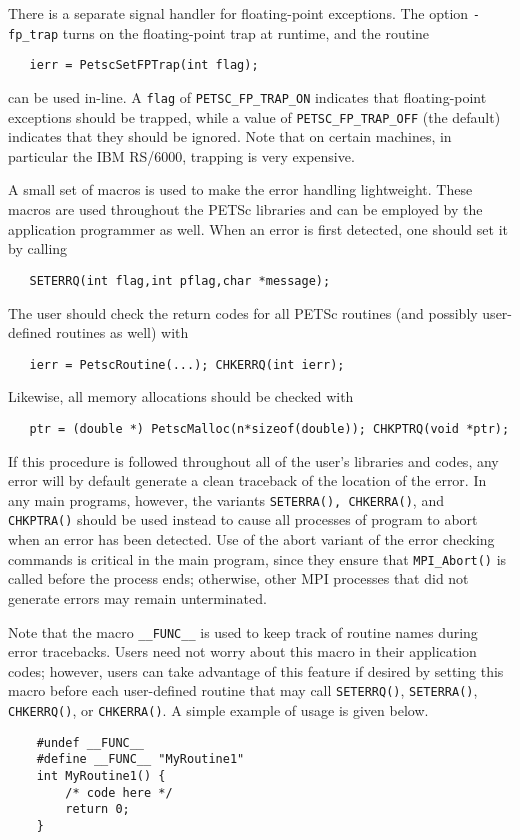 There is a separate signal handler for floating-point exceptions.
  
The option {\tt -fp\_trap} turns on the floating-point trap at runtime,
and the routine   
\begin{verbatim}
   ierr = PetscSetFPTrap(int flag);
\end{verbatim}
can be used in-line.
A {\tt flag} of {\tt PETSC\_FP\_TRAP\_ON} 
indicates that floating-point exceptions should be trapped,
while a value of {\tt PETSC\_FP\_TRAP\_OFF} (the default) indicates that they 
should be ignored.  Note that on certain machines, in particular 
the IBM RS/6000, trapping is very expensive.

A small set of macros is used to make the error handling lightweight.
These macros are used throughout the PETSc libraries and can be employed
by the application    
programmer as well.  When an error is first detected, 
one should set it by calling
\begin{verbatim}
   SETERRQ(int flag,int pflag,char *message);
\end{verbatim}
The user should check the return codes for all PETSc routines (and
possibly user-defined routines as well) with 
\begin{verbatim}
   ierr = PetscRoutine(...); CHKERRQ(int ierr);
\end{verbatim}
Likewise, all memory allocations should be checked with 
\begin{verbatim}
   ptr = (double *) PetscMalloc(n*sizeof(double)); CHKPTRQ(void *ptr);
\end{verbatim}
If this procedure is followed throughout all of the user's libraries 
and codes, any error will by default generate a clean traceback of 
the location   
of the error.  In any main programs, however, the variants
{\tt SETERRA(), CHKERRA()}, and {\tt CHKPTRA()} should be used instead 
to cause all processes of program to abort when an error has been detected. 
Use of the abort variant of the error checking commands is critical
in the main program, since they ensure that {\tt MPI\_Abort()} is called 
before the process ends; otherwise, other MPI processes that 
did not generate errors may remain unterminated.

Note that the macro {\tt \_\_FUNC\_\_} is used to keep track of
routine names during error tracebacks.  Users need not worry about this
macro in their application codes; however, users can take advantage of this feature
if desired by setting this macro before each user-defined routine
that may call {\tt SETERRQ()}, {\tt SETERRA()}, {\tt CHKERRQ()},
or {\tt CHKERRA()}.  A simple example of usage is given below.
\begin{verbatim}
    #undef __FUNC__  
    #define __FUNC__ "MyRoutine1"
    int MyRoutine1() { 
        /* code here */
        return 0;
    }
\end{verbatim}

